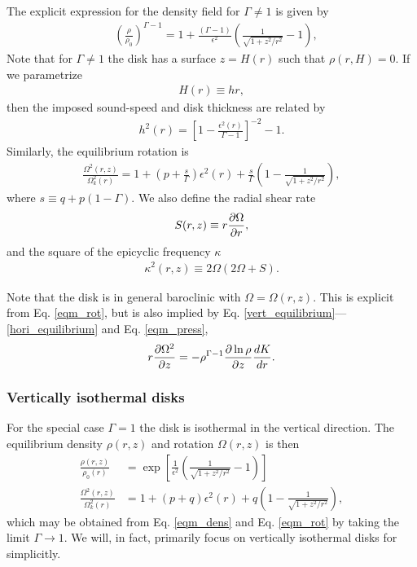 The explicit expression for the density field for
$\Gamma\neq1$ is given  by
\begin{align}\label{eqm_dens}
  &\left(\frac{\rho}{\rho_0}\right)^{\Gamma-1} = 1 +
  \frac{\left(\Gamma-1\right)}{\epsilon^2}\left(\frac{1}{\sqrt{1+z^2/r^2}}-1\right),
\end{align}
Note that for $\Gamma\neq1$ the disk has a surface $z=H(r)$ such that
$\rho(r,H)=0$. If we parametrize
\begin{align}
  H(r)\equiv h r,
\end{align}
then the imposed sound-speed and disk thickness are related by 
\begin{align}
  h^2(r) = \left[1-\frac{\epsilon^2(r)}{\Gamma-1}\right]^{-2}-1. 
\end{align}
Similarly, the equilibrium rotation is 
\begin{align}\label{eqm_rot}
  \frac{\Omega^2(r,z)}{\Omega_k^2(r)}=1 +
  \left(p+\frac{s}{\Gamma}\right)\epsilon^2(r) 
  +\frac{s}{\Gamma} \left(1-\frac{1}{\sqrt{1+z^2/r^2}}\right), 
\end{align}
where $s\equiv q+p(1-\Gamma)$. We also define the radial shear rate  
\begin{align}
  S(r,z) \equiv r\frac{\partial\Omega}{\partial r},  
\end{align}
and the square of the epicyclic frequency $\kappa$ 
\begin{align}
  \kappa^2(r,z) \equiv 2\Omega(2\Omega + S). 
\end{align}

Note that the disk is in general baroclinic with $\Omega =
\Omega(r,z)$. This is explicit from Eq. \ref{eqm_rot}, but is also
implied by Eq. \ref{vert_equilibrium}---\ref{hori_equilibrium} and 
Eq. \ref{eqm_press},  
\begin{align}
  r\frac{\partial\Omega^2}{\partial z} = - \rho^{\Gamma-1}\frac{\partial\ln\rho}{\partial
    z}\frac{dK}{dr}.\label{vertical_shear}
\end{align}

\subsubsection{Vertically isothermal disks}
For the special case $\Gamma=1$ the disk is isothermal in the
vertical direction. The equilibrium density $\rho(r,z)$ and rotation
$\Omega(r,z)$ is then 
\begin{align}
  \frac{\rho(r,z)}{\rho_0(r)} &=
  \exp{\left[\frac{1}{\epsilon^2}\left(\frac{1}{\sqrt{1+z^2/r^2}}-1\right)\right]}\\    
  \frac{\Omega^2(r,z)}{\Omega_k^2(r)}& =1+ (p+q)\epsilon^2(r) + q\left(1 -
    \frac{1}{\sqrt{1+z^2/r^2}}\right),\label{vertiso_eqm}
\end{align}
which may be obtained from Eq. \ref{eqm_dens} and Eq. \ref{eqm_rot} by
taking the limit $\Gamma\to 1$. We will, in fact, primarily focus on
vertically isothermal disks for simplicitly. 


